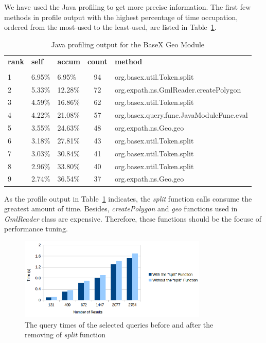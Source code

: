 \documentclass[a4paper,12pt]{article}
\begin{document}
We have used the Java profiling to get more precise information. The first few methods in profile output with the highest percentage of time occupation, ordered from the most-used to the least-used, are listed in Table~\ref{javaprofile}.
\begin{table}
\begin{tabular}{l l l c l}
\textbf{rank} & \textbf{self} & \textbf{accum} & \textbf{count} & \textbf{method} \\
 & & & &\\
1 & 6.95\% & 6.95\% & 94 & org.basex.util.Token.{\color{red}split}\\
2 & 5.33\% & 12.28\% & 72 & org.expath.ns.GmlReader.createPolygon \\
3 & 4.59\% & 16.86\% & 62 & org.basex.util.Token.{\color{red}split} \\
4 & 4.22\% & 21.08\% & 57 & org.basex.query.func.JavaModuleFunc.eval \\
5 & 3.55\% & 24.63\% & 48 & org.expath.ns.Geo.geo \\
6 & 3.18\% & 27.81\% & 43 & org.basex.util.Token.{\color{red}split} \\
7 & 3.03\% & 30.84\% & 41 & org.basex.util.Token.{\color{red}split} \\
8 & 2.96\% & 33.80\% & 40 & org.basex.util.Token.{\color{red}split} \\
9 & 2.74\% & 36.54\% & 37 & org.expath.ns.Geo.geo \\
\end{tabular}
\caption{Java profiling output for the BaseX Geo Module}
\label{javaprofile}
\end{table}
As the profile output in Table~\ref{javaprofile} indicates, the \textit{split} function calls consume the greatest amount of time. Besides, \textit{create\-Polygon} and \textit{geo} functions used in \textit{GmlReader} class are expensive. Therefore, these functions should be the focuse of performance tuning. 
\begin{figure}
\centering
\includegraphics[width=0.8\textwidth,height=0.2\textheight]{BXSplit}
\caption{The query times of the selected queries before and after the removing of \textit{split} function}
\label{figBXSplit}
\end{figure}
\end{document}
